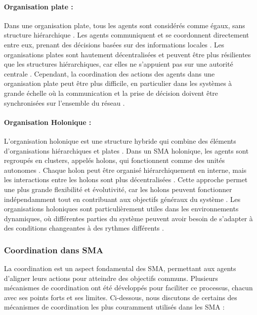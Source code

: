 \paragraph{Organisation plate :}
Dans une organisation plate, tous les agents sont considérés comme égaux, sans structure hiérarchique \cite{weiss1999multiagent}. Les agents communiquent et se coordonnent directement entre eux, prenant des décisions basées sur des informations locales \cite{durfee1999distributed}. Les organisations plates sont hautement décentralisées et peuvent être plus résilientes que les structures hiérarchiques, car elles ne s'appuient pas sur une autorité centrale \cite{weiss1999multiagent}. Cependant, la coordination des actions des agents dans une organisation plate peut être plus difficile, en particulier dans les systèmes à grande échelle où la communication et la prise de décision doivent être synchronisées sur l'ensemble du réseau \cite{durfee1999distributed}.

\paragraph{Organisation Holonique :}
L'organisation holonique est une structure hybride qui combine des éléments d'organisations hiérarchiques et plates \cite{durfee1999distributed}. Dans un SMA holonique, les agents sont regroupés en clusters, appelés holons, qui fonctionnent comme des unités autonomes \cite{weiss1999multiagent}. Chaque holon peut être organisé hiérarchiquement en interne, mais les interactions entre les holons sont plus décentralisées \cite{durfee1999distributed}. Cette approche permet une plus grande flexibilité et évolutivité, car les holons peuvent fonctionner indépendamment tout en contribuant aux objectifs généraux du système \cite{weiss1999multiagent}. Les organisations holoniques sont particulièrement utiles dans les environnements dynamiques, où différentes parties du système peuvent avoir besoin de s'adapter à des conditions changeantes à des rythmes différents \cite{durfee1999distributed}.

\subsubsection{Coordination dans SMA}

La coordination est un aspect fondamental des SMA, permettant aux agents d'aligner leurs actions pour atteindre des objectifs communs. Plusieurs mécanismes de coordination ont été développés pour faciliter ce processus, chacun avec ses points forts et ses limites. Ci-dessous, nous discutons de certains des mécanismes de coordination les plus couramment utilisés dans les SMA :

